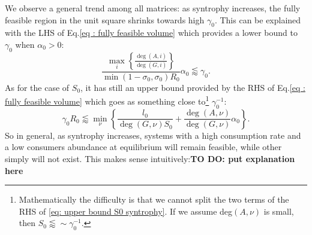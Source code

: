 \documentclass[12pt, titlepage]{report}
\begin{document}
  We observe a general trend among all matrices: as syntrophy increases, the fully feasible region in the unit square shrinks towards high $\gamma_0$. This can be explained with the LHS of Eq.\eqref{eq : fully feasible volume} which provides a lower bound to $\gamma_0$ when $\alpha_0 > 0$:
  \begin{equation}
  \frac{\max_i\left\{\frac{\deg(A,i)}{\deg(G,i)}\right\}}{\min(1-\sigma_0, \sigma_0) R_0} \alpha_0
  \lessapprox \gamma_0.
  \end{equation}
  As for the case of $S_0$, it has still an upper bound provided by the RHS of Eq.\eqref{eq : fully feasible volume} which goes as something close to\footnote{Mathematically the difficulty is that we cannot split the two terms of the RHS of \ref{eq: upper bound S0 syntrophy}. If we assume deg$(A,\nu)$ is small, then $S_0 \lessapprox \sim \gamma_0^{-1}$.} $\gamma_0^{-1}$:
  \begin{equation}
 \gamma_0 R_0
  \lessapprox
   \min_\nu \left\{ \frac{l_0}{\deg(G,\nu) S_0} + \frac{\deg(A,\nu)}{\deg(G,\nu)}\alpha_0\right\}.\label{eq: upper bound S0 syntrophy}
  \end{equation}
  So in general, as syntrophy increases, systems with a high consumption rate and a low consumers abundance at equilibrium will remain feasible, while other simply will not exist. This makes sense intuitively:\textbf{TO DO: put explanation here}
\end{document}
